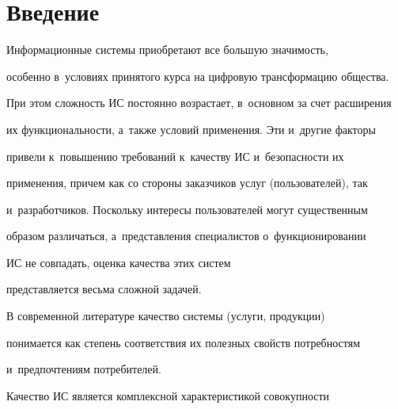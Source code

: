     










 \thispagestyle{headings}

 

\vspace*{-18pt}

    

    \section{Введение}

   

     Информационные системы приобретают все большую зна\-чи\-мость, 

особенно в~условиях принятого курса на цифровую трансформацию общества. 

При этом сложность ИС постоянно возрастает, в~основном за счет расширения 

их функциональности, а~так\-же условий применения. Эти и~другие факторы 

привели к~повышению требований к~качеству ИС и~безопас\-ности их 

применения, причем как со стороны заказчиков услуг (пользователей), так 

и~разработчиков. Поскольку интересы пользователей могут существенным 

образом различаться, а~пред\-став\-ле\-ния специалистов о~функционировании 

ИС не совпадать, оценка качества этих сис\-тем 

представляется весьма слож\-ной задачей.

     

     В современной литературе качество сис\-те\-мы (услуги, продукции) 

понимается как степень соответствия их полезных свойств потребностям 

и~предпочтениям по\-тре\-би\-телей.

     

     Качество ИС является комплексной характеристикой со\-во\-куп\-ности 


